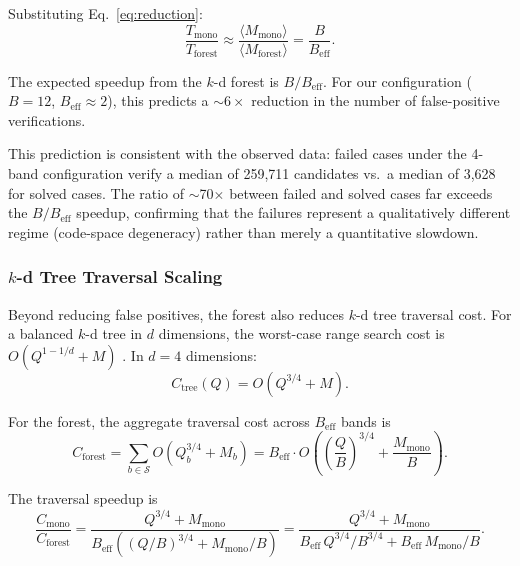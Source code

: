 \documentclass[twocolumn, 10pt]{article}
\begin{document}
Substituting Eq.~\ref{eq:reduction}:
\begin{equation} \label{eq:speedup}
    \frac{T_{\text{mono}}}{T_{\text{forest}}}
    \approx \frac{\langle M_{\text{mono}} \rangle}
                  {\langle M_{\text{forest}} \rangle}
    = \frac{B}{B_{\text{eff}}}.
\end{equation}

The expected speedup from the $k$-d forest is $B / B_{\text{eff}}$.
For our configuration ($B = 12$, $B_{\text{eff}} \approx 2$), this
predicts a $\sim 6\times$ reduction in the number of false-positive
verifications.

This prediction is consistent with the observed data: failed cases
under the 4-band configuration verify a median of 259{,}711 candidates
vs.\ a median of 3{,}628 for solved cases. The ratio of
$\sim$70$\times$ between failed and solved cases far exceeds the
$B/B_{\text{eff}}$ speedup, confirming that the failures represent a
qualitatively different regime (code-space degeneracy) rather than
merely a quantitative slowdown.

\subsubsection{$k$-d Tree Traversal Scaling}

Beyond reducing false positives, the forest also reduces $k$-d tree
traversal cost. For a balanced $k$-d tree in $d$ dimensions, the
worst-case range search cost is $O(Q^{1 - 1/d} + M)$
\citep{lee1977}. In $d = 4$ dimensions:
\begin{equation}
    C_{\text{tree}}(Q) = O(Q^{3/4} + M).
\end{equation}

For the forest, the aggregate traversal cost across $B_{\text{eff}}$
bands is
\begin{equation}
    C_{\text{forest}} = \sum_{b \in \mathcal{S}}
    O\!\left( Q_b^{3/4} + M_b \right)
    = B_{\text{eff}} \cdot O\!\left(
    \left(\frac{Q}{B}\right)^{\!3/4}
    + \frac{M_{\text{mono}}}{B} \right).
\end{equation}

The traversal speedup is
\begin{equation} \label{eq:tree_speedup}
    \frac{C_{\text{mono}}}{C_{\text{forest}}}
    = \frac{Q^{3/4} + M_{\text{mono}}}
           {B_{\text{eff}} \left(
           (Q/B)^{3/4} + M_{\text{mono}}/B \right)}
    = \frac{Q^{3/4} + M_{\text{mono}}}
           {B_{\text{eff}} \, Q^{3/4} / B^{3/4}
           + B_{\text{eff}} \, M_{\text{mono}} / B}.
\end{equation}
\end{document}
